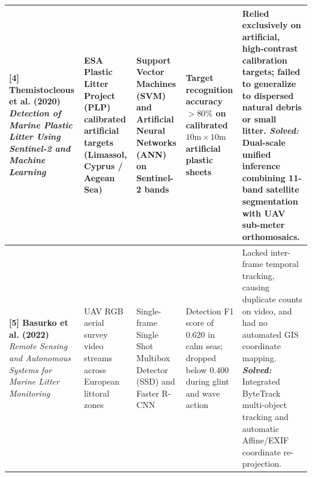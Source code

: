\documentclass[conference]{IEEEtran}
\begin{document}
\begin{table}[t!]
\begin{tabularx}{\textwidth}{L{3.0cm} L{2.4cm} L{2.6cm} L{2.5cm} Y}
\textbf{[4] Themistocleous et al. (2020)} \newline
\textit{Detection of Marine Plastic Litter Using Sentinel-2 and Machine Learning}~\cite{themistocleous2020detection} & 
ESA Plastic Litter Project (PLP) calibrated artificial targets (Limassol, Cyprus / Aegean Sea) & 
Support Vector Machines (SVM) and Artificial Neural Networks (ANN) on Sentinel-2 bands & 
Target recognition accuracy $>80\%$ on calibrated $10\text{m} \times 10\text{m}$ artificial plastic sheets & 
Relied exclusively on artificial, high-contrast calibration targets; failed to generalize to dispersed natural debris or small litter. \newline
\textit{\textbf{Solved:}} Dual-scale unified inference combining 11-band satellite segmentation with UAV sub-meter orthomosaics. \\
\midrule

\textbf{[5] Basurko et al. (2022)} \newline
\textit{Remote Sensing and Autonomous Systems for Marine Litter Monitoring}~\cite{basurko2022remote} & 
UAV RGB aerial survey video streams across European littoral zones & 
Single-frame Single Shot Multibox Detector (SSD) and Faster R-CNN & 
Detection F1 score of $0.620$ in calm seas; dropped below $0.400$ during glint and wave action & 
Lacked inter-frame temporal tracking, causing duplicate counts on video, and had no automated GIS coordinate mapping. \newline
\textit{\textbf{Solved:}} Integrated ByteTrack multi-object tracking and automatic Affine/EXIF coordinate re-projection. \\

\bottomrule
\end{tabularx}
\end{table}
\end{document}
